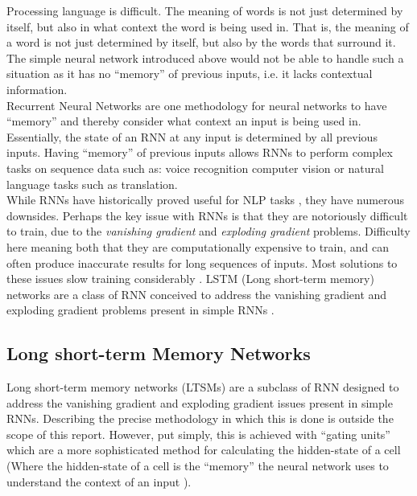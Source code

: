\noindent
Processing language is difficult. The meaning of words is not just determined by itself, but also in what
context the word is being used in. That is, the meaning of a word is not just determined by itself,
but also by the words that surround it. 
The simple neural network introduced above would not be able to handle such a situation as it has no ``memory''
of previous inputs, i.e. it lacks contextual information. \\

\noindent
Recurrent Neural Networks are one methodology for neural networks to have ``memory'' 
and thereby consider what context an input is being used in.
Essentially, the state of an RNN at any input is determined by all previous inputs.
Having ``memory'' of previous inputs allows RNNs to perform complex tasks on sequence data such as: voice recognition
computer vision or natural language tasks such as translation. \\ %

\noindent
While RNNs have historically proved useful for NLP tasks \cite{DBLP:journals/corr/BahdanauCB14}, they have
numerous downsides. Perhaps the key issue with RNNs is that they are notoriously difficult to train,
due to the \emph{vanishing gradient} and \emph{exploding gradient} problems. Difficulty here meaning both 
that they are computationally expensive to train, and can often produce inaccurate results for long sequences of inputs.
Most solutions to these issues slow training considerably \cite{DBLP:journals/corr/abs-1211-5063}.
LSTM (Long short-term memory) networks are a class of RNN conceived
to address the vanishing gradient and exploding gradient problems present in simple RNNs
\cite{10.1162/neco.1997.9.8.1735}.\\ 

\subsection{Long short-term Memory Networks}

\noindent
Long short-term memory networks (LTSMs) are a subclass of RNN designed to address the
vanishing gradient and exploding gradient issues present in simple RNNs. Describing the precise methodology
in which this is done is outside the scope of this report. However, put simply, this is achieved with ``gating units''
which are a more sophisticated method for calculating the hidden-state of a cell
(Where the hidden-state of a cell is the ``memory'' the neural network uses to understand the context of an input \cite{salem2022recurrent}).\\

